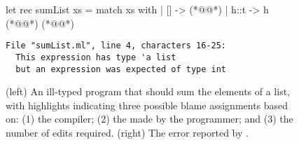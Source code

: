 \begin{figure}[ht]
\begin{minipage}{0.45\linewidth}
\begin{ecode}
  let rec sumList xs =
    match xs with
    | []   -> (*@\hlTree{\hlSherrloc{[]}}@*)
    | h::t -> h (*@\hlTree{+}@*) (*@@*)
\end{ecode}
\end{minipage}
\begin{minipage}{0.49\linewidth}
\begin{verbatim}
File "sumList.ml", line 4, characters 16-25:
  This expression has type 'a list
  but an expression was expected of type int
\end{verbatim}
\end{minipage}
\caption{(left) An ill-typed \ocaml program that should sum the elements of a
  list, with highlights indicating three possible blame assignments based on:
  (1) the \hlFix{\ocaml} compiler;
  (2) the  made by the programmer; and
  (3)  the number of edits required.
  (right) The error reported by \ocaml.}
\label{fig:sumList}
\end{figure}
